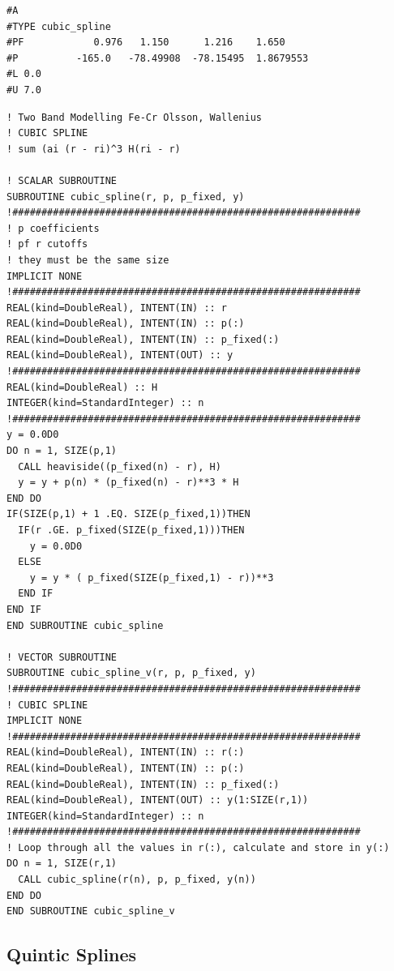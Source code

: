 \begin{lstlisting}[style=sPseudo,caption={Cubic splines potential input file}]
#A
#TYPE cubic_spline
#PF            0.976   1.150      1.216    1.650
#P          -165.0   -78.49908  -78.15495  1.8679553
#L 0.0 
#U 7.0 
\end{lstlisting}





\begin{lstlisting}[style=sPseudo,caption={Cubic splines subroutine}]
! Two Band Modelling Fe-Cr Olsson, Wallenius
! CUBIC SPLINE
! sum (ai (r - ri)^3 H(ri - r)

! SCALAR SUBROUTINE
SUBROUTINE cubic_spline(r, p, p_fixed, y)
!############################################################
! p coefficients
! pf r cutoffs
! they must be the same size
IMPLICIT NONE
!############################################################
REAL(kind=DoubleReal), INTENT(IN) :: r
REAL(kind=DoubleReal), INTENT(IN) :: p(:)
REAL(kind=DoubleReal), INTENT(IN) :: p_fixed(:)
REAL(kind=DoubleReal), INTENT(OUT) :: y
!############################################################
REAL(kind=DoubleReal) :: H
INTEGER(kind=StandardInteger) :: n
!############################################################
y = 0.0D0
DO n = 1, SIZE(p,1)
  CALL heaviside((p_fixed(n) - r), H)
  y = y + p(n) * (p_fixed(n) - r)**3 * H
END DO
IF(SIZE(p,1) + 1 .EQ. SIZE(p_fixed,1))THEN
  IF(r .GE. p_fixed(SIZE(p_fixed,1)))THEN
    y = 0.0D0
  ELSE
    y = y * ( p_fixed(SIZE(p_fixed,1) - r))**3
  END IF
END IF
END SUBROUTINE cubic_spline

! VECTOR SUBROUTINE
SUBROUTINE cubic_spline_v(r, p, p_fixed, y)
!############################################################
! CUBIC SPLINE
IMPLICIT NONE
!############################################################
REAL(kind=DoubleReal), INTENT(IN) :: r(:)
REAL(kind=DoubleReal), INTENT(IN) :: p(:)
REAL(kind=DoubleReal), INTENT(IN) :: p_fixed(:)
REAL(kind=DoubleReal), INTENT(OUT) :: y(1:SIZE(r,1))
INTEGER(kind=StandardInteger) :: n
!############################################################
! Loop through all the values in r(:), calculate and store in y(:)
DO n = 1, SIZE(r,1)
  CALL cubic_spline(r(n), p, p_fixed, y(n))
END DO
END SUBROUTINE cubic_spline_v
\end{lstlisting}





\clearpage
\FloatBarrier
\subsection{Quintic Splines}

